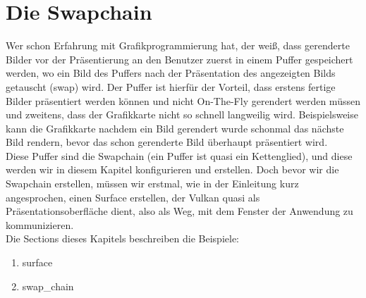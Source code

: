 \documentclass[11pt,a4paper]{report}
\begin{document}
\chapter{Die Swapchain}
Wer schon Erfahrung mit Grafikprogrammierung hat, der weiß, dass gerenderte Bilder vor der Präsentierung an den Benutzer zuerst in einem Puffer gespeichert werden, wo ein Bild des Puffers nach der Präsentation des angezeigten Bilds getauscht (swap) wird. Der Puffer ist hierfür der Vorteil, dass erstens fertige Bilder präsentiert werden können und nicht On-The-Fly gerendert werden müssen und zweitens, dass der Grafikkarte nicht so schnell langweilig wird. Beispielsweise kann die Grafikkarte nachdem ein Bild gerendert wurde schonmal das nächste Bild rendern, bevor das schon gerenderte Bild überhaupt präsentiert wird.\\
Diese Puffer sind die Swapchain (ein Puffer ist quasi ein Kettenglied), und diese werden wir in diesem Kapitel konfigurieren und erstellen. Doch bevor wir die Swapchain erstellen, müssen wir erstmal, wie in der Einleitung kurz angesprochen, einen Surface erstellen, der Vulkan quasi als Präsentationsoberfläche dient, also als Weg, mit dem Fenster der Anwendung zu kommunizieren.\\
Die Sections dieses Kapitels beschreiben die Beispiele:
\begin{enumerate}
	\item surface
	\item swap\_chain
\end{enumerate}
\end{document}
